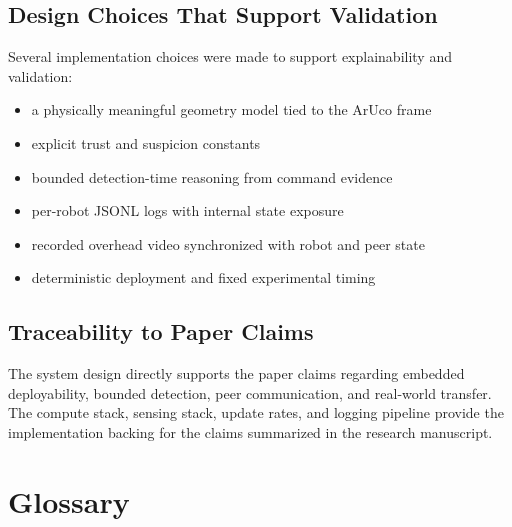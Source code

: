 \documentclass[a4paper,oneside,titlepage,11pt]{report}
\begin{document}
\section{Design Choices That Support Validation}
Several implementation choices were made to support explainability and validation:
\begin{itemize}
    \item a physically meaningful geometry model tied to the ArUco frame
    \item explicit trust and suspicion constants
    \item bounded detection-time reasoning from command evidence
    \item per-robot JSONL logs with internal state exposure
    \item recorded overhead video synchronized with robot and peer state
    \item deterministic deployment and fixed experimental timing
\end{itemize}

\section{Traceability to Paper Claims}
The system design directly supports the paper claims regarding embedded deployability, bounded detection, peer communication, and real-world transfer. The compute stack, sensing stack, update rates, and logging pipeline provide the implementation backing for the claims summarized in the research manuscript.


\appendix

\chapter{Glossary}
\label{app:glossary}
\end{document}
